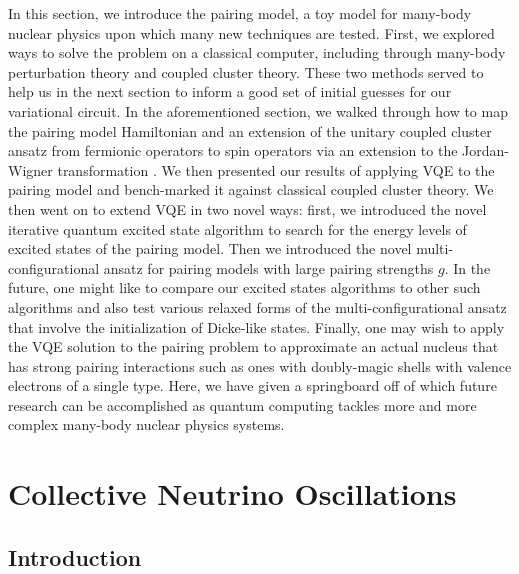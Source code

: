 \documentclass[10pt]{article}
\begin{document}
In this section, we introduce the pairing model, a toy model for many-body nuclear physics upon which many new techniques are tested. First, we explored ways to solve the problem on a classical computer, including through many-body perturbation theory and coupled cluster theory. These two methods served to help us in the next section to inform a good set of initial guesses for our variational circuit. In the aforementioned section, we walked through how to map the pairing model Hamiltonian and an extension of the unitary coupled cluster ansatz from fermionic operators to spin operators via an extension to the Jordan-Wigner transformation . We then presented our results of applying VQE to the pairing model and bench-marked it against classical coupled cluster theory. We then went on to extend VQE in two novel ways: first, we introduced the novel iterative quantum excited state algorithm to search for the energy levels of excited states of the pairing model. Then we introduced the novel multi-configurational ansatz for pairing models with large pairing strengths $g$. In the future, one might like to compare our excited states algorithms to other such algorithms and also test various relaxed forms of the multi-configurational ansatz that involve the initialization of Dicke-like states. Finally, one may wish to apply the VQE solution to the pairing problem to approximate an actual nucleus that has strong pairing interactions such as ones with doubly-magic shells with valence electrons of a single type. Here, we have given a springboard off of which future research can be accomplished as quantum computing tackles more and more complex many-body nuclear physics systems.

\chapter{Collective Neutrino Oscillations}

\nocite{ref:cno}

\section{Introduction}
\end{document}
